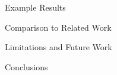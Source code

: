 \documentclass[9pt]{beamer}
\begin{document}
%
\begin{frame}{Example Results}
\end{frame}
%
\begin{frame}{Comparison to Related Work}
\end{frame}
%
\begin{frame}{Limitations and Future Work}
\end{frame}
%
\begin{frame}{Conclusions}
\end{frame}
%
\begin{frame}{}
  \centering\huge\sffamily
  \textbf{}
\end{frame}
%
\begin{frame}[allowframebreaks]{}
  \scriptsize
  
  
\end{frame}
%
\end{document}
